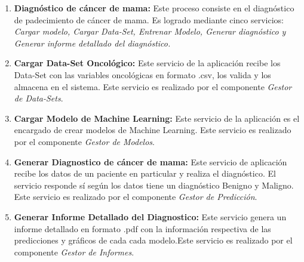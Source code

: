 \begin{enumerate}[label=\textbf{\arabic*})]
	
	\item  \textbf{Diagnóstico de cáncer de mama:} Este proceso consiste en el diagnóstico de padecimiento de cáncer de mama. Es logrado mediante cinco servicios: \textit{Cargar modelo, Cargar Data-Set, Entrenar Modelo, Generar diagnóstico y Generar informe detallado del diagnóstico.} 
	
	\item  \textbf{Cargar Data-Set Oncológico:} Este servicio de la aplicación recibe los Data-Set con las variables oncológicas en formato .csv,  los valida  y los almacena en el sistema. Este servicio es realizado por el componente \textit{Gestor de Data-Sets}.
	
	\item  \textbf{Cargar Modelo de Machine Learning:} Este servicio de la aplicación es el encargado de crear modelos de Machine Learning. Este servicio es realizado por el componente \textit{Gestor de Modelos}.
	
	\item  \textbf{Generar Diagnostico de cáncer de mama:} Este servicio de aplicación recibe los datos de un paciente en particular  y realiza el diagnóstico. El servicio responde sí según los datos tiene un diagnóstico Benigno y Maligno. Este servicio es realizado por el componente \textit{Gestor de Predicción}.
	
	\item  \textbf{Generar Informe Detallado del Diagnostico:} Este servicio genera un informe detallado en formato .pdf con la información respectiva de las predicciones y gráficos de cada cada modelo.Este servicio es realizado por el componente \textit{Gestor de Informes}.
	
	

\end{enumerate}